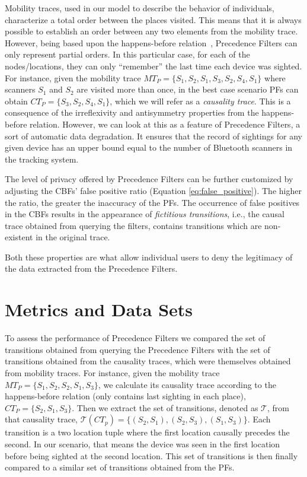 Mobility traces, used in our model to describe the behavior of
individuals, characterize a total order between the places
visited. This means that it is always possible to establish an order
between any two elements from the mobility trace. However, being based upon the
happens-before relation~\cite{Lamport:1978}, Precedence Filters can
only represent partial orders. In this particular case, for each of
the nodes/locations, they can only ``remember'' the last time each
device was sighted. For instance, given the mobility trace
$MT_{P}=\{S_1,S_2,S_1,S_3,S_2,S_4,S_1\}$ where scanners $S_1$ and $S_2$
are visited more than once, in the best case scenario PFs can obtain
$CT_{P}=\{S_3,S_2,S_4,S_1\}$, which we will refer as a \emph{causality
 trace}. This is a consequence of the irreflexivity and antisymmetry
properties from the happens-before relation. However, we can look at
this as a feature of Precedence Filters, a sort of automatic data
degradation. It ensures that the record of sightings for any given
device has an upper bound equal to the number of Bluetooth scanners in
the tracking system.

The level of privacy offered by Precedence Filters can be further
customized by adjusting the CBFs' false positive ratio (Equation
\ref{eq:false_positive}). The higher the ratio, the greater the
inaccuracy of the PFs. The occurrence of false positives in the CBFs
results in the appearance of \emph{fictitious transitions}, i.e., the
causal trace obtained from querying the filters, contains transitions
which are non-existent in the original trace.

Both these properties are what allow individual users to deny the
legitimacy of the data extracted from the Precedence Filters.

\section{Metrics and Data Sets}
\label{sec:metrics-data-sets}

To assess the performance of Precedence Filters we compared the set of
transitions obtained from querying the Precedence Filters with the set
of transitions obtained from the causality traces, which were
themselves obtained from mobility traces.  For instance, given the
mobility trace $MT_P=\{S_1,S_2,S_2,S_1,S_3\}$, we calculate its
causality trace according to the happens-before relation (only
contains last sighting in each place), $CT_P=\{S_2,S_1,S_3\}$. Then we
extract the set of transitions, denoted as $\mathcal{T}$, from that causality trace,
$\mathcal{T}(CT_p)=\{(S_2,S_1),(S_2,S_3),(S_1,S_3)\}$. Each transition is a two location
tuple where the first location causally precedes the second. In our
scenario, that means the device was seen in the first location before
being sighted at the second location. This set of transitions is then
finally compared to a similar set of transitions obtained from the PFs.


